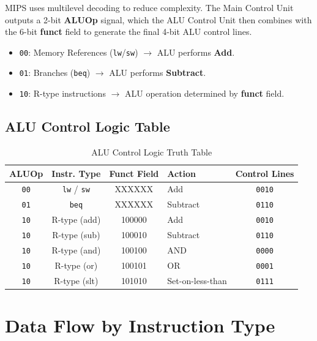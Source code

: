 MIPS uses multilevel decoding to reduce complexity. The Main Control Unit outputs a 2-bit \textbf{ALUOp} signal, which the ALU Control Unit then combines with the 6-bit \textbf{funct} field to generate the final 4-bit ALU control lines.

\begin{proposition}
\begin{itemize}
    \item \texttt{00}: Memory References (\texttt{lw}/\texttt{sw}) $\rightarrow$ ALU performs \textbf{Add}.
    \item \texttt{01}: Branches (\texttt{beq}) $\rightarrow$ ALU performs \textbf{Subtract}.
    \item \texttt{10}: R-type instructions $\rightarrow$ ALU operation determined by \textbf{funct} field.
\end{itemize}
\end{proposition}

\subsection{ALU Control Logic Table}

\begin{table}[h]
\centering
\begin{tabular}{c c c l c}
\toprule
\textbf{ALUOp} & \textbf{Instr. Type} & \textbf{Funct Field} & \textbf{Action} & \textbf{Control Lines} \\
\midrule
\texttt{00} & \texttt{lw} / \texttt{sw} & XXXXXX & Add & \texttt{0010} \\
\texttt{01} & \texttt{beq} & XXXXXX & Subtract & \texttt{0110} \\
\texttt{10} & R-type (add) & 100000 & Add & \texttt{0010} \\
\texttt{10} & R-type (sub) & 100010 & Subtract & \texttt{0110} \\
\texttt{10} & R-type (and) & 100100 & AND & \texttt{0000} \\
\texttt{10} & R-type (or) & 100101 & OR & \texttt{0001} \\
\texttt{10} & R-type (slt) & 101010 & Set-on-less-than & \texttt{0111} \\
\bottomrule
\end{tabular}
\caption{ALU Control Logic Truth Table}
\end{table}

\section{Data Flow by Instruction Type}


